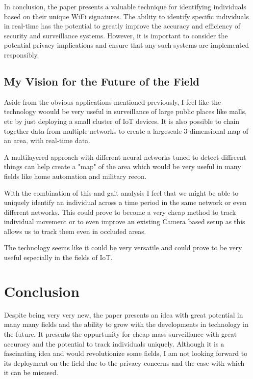 \documentclass{article}
\begin{document}
In conclusion, the paper presents a valuable technique for identifying individuals based on their unique WiFi signatures. The ability to identify specific individuals in real-time has the potential to greatly improve the accuracy and efficiency of security and surveillance systems. However, it is important to consider the potential privacy implications and ensure that any such systems are implemented responsibly.


\subsection{My Vision for the Future of the Field}
Aside from the obvious applications mentioned previously, I feel like the technology woould be very useful in surveillance of large public places like malls, etc by just deploying a small cluster of IoT devices.
It is also possible to chain together data from multiple networks to create a largescale 3 dimensional map of an area, with real-time data.

A multilayered approach with different neural networks tuned to detect diffreent things can help create a "map" of the area which would be very useful in many fields like home automation and military recon. 

With the combination of this and gait analysis I feel that we might be able to uniquely identify an individual across a time period in the same network or even different networks. 
This could prove to become a very cheap method to track individual movement or to even improve an existing Camera based setup as this allows us to track them even in occluded areas.

The technology seems like it could be very versatile and could prove to be very useful especially in the fields of IoT. 

\section{Conclusion} %
\label{sec:Conclusion}

Despite being very very new, the paper presents an idea with great potential in many many fields and the ability to grow with the developments in technology in the future. 
It presents the oppurtunity for cheap mass surveillance with great accuracy and the potential to track individuals uniquely. 
Although it is a fascinating idea and would revolutionize some fields, I am not looking forward to its deployment on the field due to the privacy concerns and the ease with which it can be misused.



  
\end{document}
